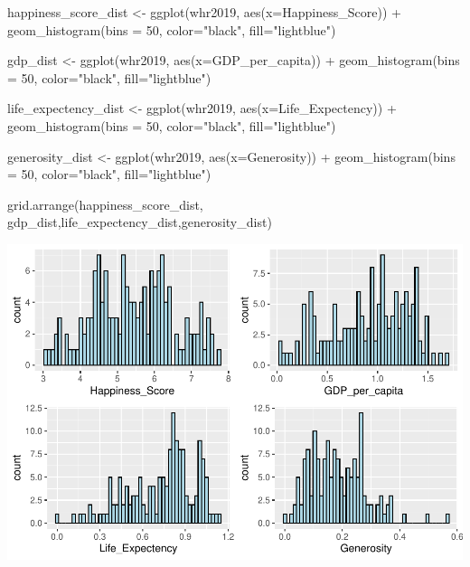 \documentclass[
]{article}
\newenvironment{Shaded}{\begin{snugshade}}{\end{snugshade}}
\newcommand{\AttributeTok}[1]{\textcolor[rgb]{0.77,0.63,0.00}{#1}}
\newcommand{\DecValTok}[1]{\textcolor[rgb]{0.00,0.00,0.81}{#1}}
\newcommand{\FunctionTok}[1]{\textcolor[rgb]{0.00,0.00,0.00}{#1}}
\newcommand{\NormalTok}[1]{#1}
\newcommand{\OtherTok}[1]{\textcolor[rgb]{0.56,0.35,0.01}{#1}}
\newcommand{\SpecialCharTok}[1]{\textcolor[rgb]{0.00,0.00,0.00}{#1}}
\newcommand{\StringTok}[1]{\textcolor[rgb]{0.31,0.60,0.02}{#1}}
\begin{document}
\begin{Shaded}
\begin{Highlighting}[]
\NormalTok{happiness\_score\_dist }\OtherTok{\textless{}{-}} \FunctionTok{ggplot}\NormalTok{(whr2019, }\FunctionTok{aes}\NormalTok{(}\AttributeTok{x=}\NormalTok{Happiness\_Score)) }\SpecialCharTok{+}
  \FunctionTok{geom\_histogram}\NormalTok{(}\AttributeTok{bins =} \DecValTok{50}\NormalTok{, }\AttributeTok{color=}\StringTok{"black"}\NormalTok{, }\AttributeTok{fill=}\StringTok{"lightblue"}\NormalTok{)}

\NormalTok{gdp\_dist }\OtherTok{\textless{}{-}} \FunctionTok{ggplot}\NormalTok{(whr2019, }\FunctionTok{aes}\NormalTok{(}\AttributeTok{x=}\NormalTok{GDP\_per\_capita)) }\SpecialCharTok{+}
  \FunctionTok{geom\_histogram}\NormalTok{(}\AttributeTok{bins =} \DecValTok{50}\NormalTok{, }\AttributeTok{color=}\StringTok{"black"}\NormalTok{, }\AttributeTok{fill=}\StringTok{"lightblue"}\NormalTok{)}

\NormalTok{life\_expectency\_dist }\OtherTok{\textless{}{-}} \FunctionTok{ggplot}\NormalTok{(whr2019, }\FunctionTok{aes}\NormalTok{(}\AttributeTok{x=}\NormalTok{Life\_Expectency)) }\SpecialCharTok{+}
  \FunctionTok{geom\_histogram}\NormalTok{(}\AttributeTok{bins =} \DecValTok{50}\NormalTok{, }\AttributeTok{color=}\StringTok{"black"}\NormalTok{, }\AttributeTok{fill=}\StringTok{"lightblue"}\NormalTok{)}

\NormalTok{generosity\_dist }\OtherTok{\textless{}{-}} \FunctionTok{ggplot}\NormalTok{(whr2019, }\FunctionTok{aes}\NormalTok{(}\AttributeTok{x=}\NormalTok{Generosity)) }\SpecialCharTok{+}
  \FunctionTok{geom\_histogram}\NormalTok{(}\AttributeTok{bins =} \DecValTok{50}\NormalTok{, }\AttributeTok{color=}\StringTok{"black"}\NormalTok{, }\AttributeTok{fill=}\StringTok{"lightblue"}\NormalTok{)}

\FunctionTok{grid.arrange}\NormalTok{(happiness\_score\_dist, gdp\_dist,life\_expectency\_dist,generosity\_dist)}
\end{Highlighting}
\end{Shaded}

\includegraphics{World-Happiness_files/figure-latex/unnamed-chunk-2-1.pdf}
\end{document}
